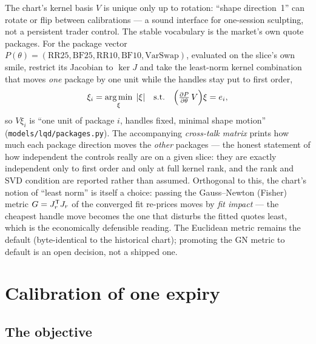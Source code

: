 \documentclass[11pt]{article}
\begin{document}
The chart's kernel basis $V$ is unique only up to rotation: ``shape
direction~1'' can rotate or flip between calibrations --- a sound interface
for one-session sculpting, not a persistent trader control. The stable
vocabulary is the market's own quote packages. For the package vector
$P(\theta)=(\text{RR25},\text{BF25},\text{RR10},\text{BF10},\text{VarSwap})$,
evaluated on the slice's own smile, restrict its Jacobian to $\ker J$ and take
the least-norm kernel combination that moves \emph{one} package by one unit
while the handles stay put to first order,
\begin{equation}
\xi_i=\operatorname*{arg\,min}_{\xi}\;|\xi|
\quad\text{s.t.}\quad
\Big(\tfrac{\partial P}{\partial\theta}\,V\Big)\xi=e_i,
\end{equation}
so $V\xi_i$ is ``one unit of package $i$, handles fixed, minimal shape
motion'' (\texttt{models/lqd/packages.py}). The accompanying
\emph{cross-talk matrix} prints how much each package direction moves the
\emph{other} packages --- the honest statement of how independent the
controls really are on a given slice: they are exactly independent only to
first order and only at full kernel rank, and the rank and SVD condition are
reported rather than assumed. Orthogonal to this, the chart's notion of
``least norm'' is itself a choice: passing the Gauss--Newton (Fisher) metric
$G=J_r^{\mathsf{T}} J_r$ of the converged fit re-prices moves by \emph{fit impact} ---
the cheapest handle move becomes the one that disturbs the fitted quotes
least, which is the economically defensible reading. The Euclidean metric
remains the default (byte-identical to the historical chart); promoting the
GN metric to default is an open decision, not a shipped one.

\section{Calibration of one expiry}
\label{sec:calib}

\subsection{The objective}
\end{document}
